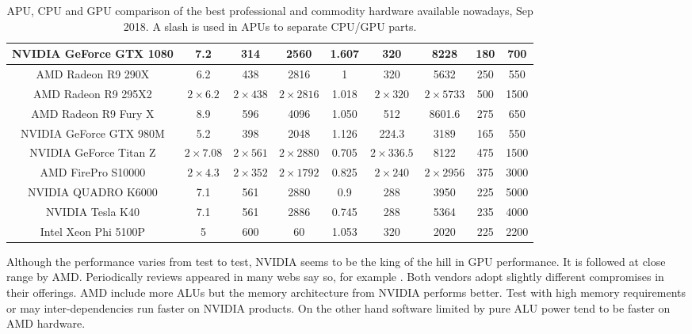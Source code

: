 \documentclass{article}
\begin{document}
\begin{table}[!ht]
{\begin{tabular}{|c|c|c|c|c|c|c|c|c|}
NVIDIA GeForce GTX 1080 & 7.2           & 314          & 2560          & 1.607      & 320          & 8228           & 180 & 700    \\
\hline
\hline
AMD Radeon R9 290X      & 6.2           & 438          & 2816          & 1          & 320          & 5632           & 250 & 550    \\
\hline
AMD Radeon R9 295X2     & $2\times6.2$  & $2\times438$ & $2\times2816$ & 1.018      & $2\times320$ & $2\times5733$  & 500 & 1500   \\
\hline
AMD Radeon R9 Fury X    & 8.9           & 596          & 4096          & 1.050      & 512          & 8601.6         & 275 & 650    \\
\hline
NVIDIA GeForce GTX 980M & 5.2           & 398          & 2048          & 1.126      & 224.3        & 3189           & 165 & 550    \\
\hline
NVIDIA GeForce Titan Z  & $2\times7.08$ & $2\times561$ & $2\times2880$ & 0.705      & $2\times336.5$ & 8122         & 475 & 1500   \\
\hline
\hline
AMD FirePro S10000      & $2\times4.3$  & $2\times352$ & $2\times1792$ & 0.825      & $2\times240$ & $2\times2956$  & 375 & 3000   \\
\hline
NVIDIA QUADRO K6000     & 7.1           & 561          & 2880          & 0.9        & 288          & 3950           & 225 & 5000   \\
\hline
\hline
NVIDIA Tesla K40        & 7.1           & 561          & 2886          & 0.745      & 288          & 5364           & 235 & 4000   \\
\hline
Intel Xeon Phi 5100P    & 5             & 600          & 60            & 1.053      & 320          & 2020           & 225 & 2200   \\
\hline

\end{tabular}
}
\caption{APU, CPU and GPU comparison of the best professional and commodity hardware available nowadays, Sep 2018. A slash is used in APUs to separate CPU/GPU parts. \label{tab:features}}
\end{table}

Although the performance varies from test to test, NVIDIA seems to be the king of the hill in GPU performance. It is followed at close range by AMD. Periodically reviews appeared in many webs say so, for example \cite{benchmarkGPU2016}. Both vendors adopt slightly different compromises in their offerings. AMD include more ALUs but the memory architecture from NVIDIA performs better. Test with high memory requirements or may inter-dependencies run faster on NVIDIA products. On the other hand software limited by pure ALU power tend to be faster on AMD hardware.
\end{document}

